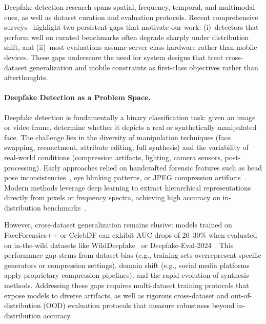 Deepfake detection research spans spatial, frequency, temporal, and multimodal cues, as well as dataset curation and evaluation protocols. Recent comprehensive surveys~\cite{verdoliva2020forensics_survey,pei2024deepfakesurvey,electronics2024survey} highlight two persistent gaps that motivate our work: (i)~detectors that perform well on curated benchmarks often degrade sharply under distribution shift, and (ii)~most evaluations assume server\hyp class hardware rather than mobile devices. These gaps underscore the need for system designs that treat cross\hyp dataset generalization and mobile constraints as first\hyp class objectives rather than afterthoughts.

\paragraph{Deepfake Detection as a Problem Space.}
Deepfake detection is fundamentally a binary classification task: given an image or video frame, determine whether it depicts a real or synthetically manipulated face. The challenge lies in the diversity of manipulation techniques (face swapping, reenactment, attribute editing, full synthesis) and the variability of real\hyp world conditions (compression artifacts, lighting, camera sensors, post\hyp processing). Early approaches relied on handcrafted forensic features such as head pose inconsistencies~\cite{yang2019exposing}, eye blinking patterns, or JPEG compression artifacts~\cite{cozzolino2019noiseprint}. Modern methods leverage deep learning to extract hierarchical representations directly from pixels or frequency spectra, achieving high accuracy on in\hyp distribution benchmarks~\cite{rossler2019faceforensicspp,dolhansky2020dfdc,li2020celebdf}.

However, cross\hyp dataset generalization remains elusive: models trained on FaceForensics++ or CelebDF can exhibit AUC drops of 20–30\% when evaluated on in\hyp the\hyp wild datasets like WildDeepfake~\cite{wilddeepfake2021} or Deepfake\hyp Eval\hyp 2024~\cite{deepeval2024}. This performance gap stems from dataset bias (e.g., training sets overrepresent specific generators or compression settings), domain shift (e.g., social media platforms apply proprietary compression pipelines), and the rapid evolution of synthesis methods. Addressing these gaps requires multi\hyp dataset training protocols that expose models to diverse artifacts, as well as rigorous cross\hyp dataset and out\hyp of\hyp distribution (OOD) evaluation protocols that measure robustness beyond in\hyp distribution accuracy.

